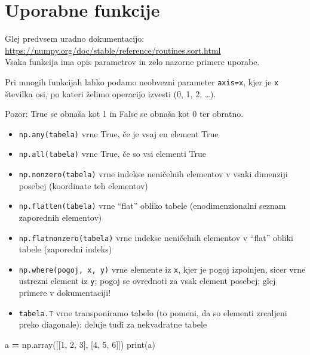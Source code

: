 \documentclass[
]{report}
\newenvironment{Shaded}{\begin{snugshade}}{\end{snugshade}}
\newcommand{\BuiltInTok}[1]{#1}
\newcommand{\DecValTok}[1]{\textcolor[rgb]{0.00,0.00,0.81}{#1}}
\newcommand{\NormalTok}[1]{#1}
\newcommand{\OperatorTok}[1]{\textcolor[rgb]{0.81,0.36,0.00}{\textbf{#1}}}
\providecommand{\tightlist}{%
  \setlength{\itemsep}{0pt}\setlength{\parskip}{0pt}}
\begin{document}
\hypertarget{uporabne-funkcije}{%
\section{Uporabne funkcije}\label{uporabne-funkcije}}

Glej predvsem uradno dokumentacijo: \url{https://numpy.org/doc/stable/reference/routines.sort.html}\\
Vsaka funkcija ima opis parametrov in zelo nazorne primere uporabe.

Pri mnogih funkcijah lahko podamo neobvezni parameter \texttt{axis=x}, kjer je \texttt{x}
številka osi, po kateri želimo operacijo izvesti (0, 1, 2, \ldots).

Pozor: True se obnaša kot 1 in False se obnaša kot 0 ter obratno.

\begin{itemize}
\tightlist
\item
  \texttt{np.any(tabela)} vrne True, če je vsaj en element True
\item
  \texttt{np.all(tabela)} vrne True, če so vsi elementi True
\item
  \texttt{np.nonzero(tabela)} vrne indekse neničelnih elementov v vsaki dimenziji posebej (koordinate teh elementov)
\item
  \texttt{np.flatten(tabela)} vrne ``flat'' obliko tabele (enodimenzionalni seznam zaporednih elementov)
\item
  \texttt{np.flatnonzero(tabela)} vrne indekse neničelnih elementov v ``flat'' obliki tabele (zaporedni indeks)
\item
  \texttt{np.where(pogoj,\ x,\ y)} vrne elemente iz \texttt{x}, kjer je pogoj izpolnjen, sicer vrne ustrezni element iz \texttt{y}; pogoj se ovrednoti za vsak element posebej; glej primere v dokumentaciji!
\item
  \texttt{tabela.T} vrne transponiramo tabelo (to pomeni, da so elementi zrcaljeni preko diagonale); deluje tudi za nekvadratne tabele
\end{itemize}

\begin{Shaded}
\begin{Highlighting}[]
\NormalTok{a }\OperatorTok{=}\NormalTok{ np.array([[}\DecValTok{1}\NormalTok{, }\DecValTok{2}\NormalTok{, }\DecValTok{3}\NormalTok{], [}\DecValTok{4}\NormalTok{, }\DecValTok{5}\NormalTok{, }\DecValTok{6}\NormalTok{]])}
\BuiltInTok{print}\NormalTok{(a)}
\end{Highlighting}
\end{Shaded}
\end{document}
